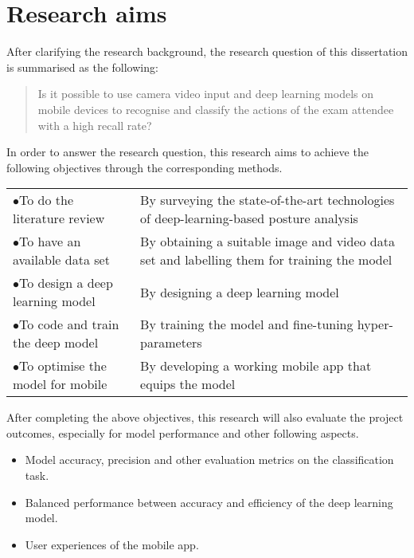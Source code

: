 \section{Research aims}
\label{sec:Research aims}
After clarifying the research background, the research question of this dissertation is summarised as the following:

\begin{quote}
    Is it possible to use camera video input and deep learning models on mobile devices to recognise and classify the actions of the exam attendee with a high recall rate?
\end{quote}

In order to answer the research question, this research aims to achieve the following objectives through the corresponding methods.

\begin{longtable}{>{\hspace*{-0.3cm}$\bullet$\hspace*{0.2cm}}p{}p{}}
To do the literature review & By surveying the state-of-the-art technologies of deep-learning-based posture analysis \\
To have an available data set & By obtaining a suitable image and video data set and labelling them for training the model \\
To design a deep learning model & By designing a deep learning model \\
To code and train the deep model & By training the model and fine-tuning hyper-parameters \\
To optimise the model for mobile & By developing a working mobile app that equips the model \\
\end{longtable}

After completing the above objectives, this research will also evaluate the project outcomes, especially for model performance and other following aspects.

\begin{itemize}
    \item Model accuracy, precision and other evaluation metrics on the classification task.
    \item Balanced performance between accuracy and efficiency of the deep learning model.
    \item User experiences of the mobile app.
\end{itemize}
